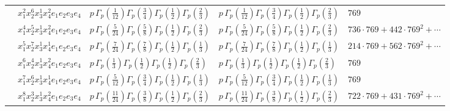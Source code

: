 \documentclass[11pt]{article}
\begin{document}
\begin{table}[ht]
{\begin{tabular}{@{}lllll@{}}
 & $x_{1}^{2} x_{2}^{6} x_{3}^{1} x_{4}^{2}  e_{1} e_{2} e_{3} e_{4}$ & $p \, \Gamma_p \left( \frac{1}{12} \right) \Gamma_p \left( \frac{3}{4} \right) \Gamma_p \left( \frac{1}{2} \right) \Gamma_p \left( \frac{2}{3} \right)$ & $p \, \Gamma_p \left( \frac{1}{12} \right) \Gamma_p \left( \frac{3}{4} \right) \Gamma_p \left( \frac{1}{2} \right) \Gamma_p \left( \frac{2}{3} \right)$ & $769$ \\
 & $x_{1}^{4} x_{2}^{5} x_{3}^{1} x_{4}^{2}  e_{1} e_{2} e_{3} e_{4}$ & $p \, \Gamma_p \left( \frac{5}{24} \right) \Gamma_p \left( \frac{5}{8} \right) \Gamma_p \left( \frac{1}{2} \right) \Gamma_p \left( \frac{2}{3} \right)$ & $p \, \Gamma_p \left( \frac{5}{24} \right) \Gamma_p \left( \frac{5}{8} \right) \Gamma_p \left( \frac{1}{2} \right) \Gamma_p \left( \frac{2}{3} \right)$ & $736{\cdot}769{+}442{\cdot}769^{2}{+}\cdots$ \\
 & $x_{1}^{5} x_{2}^{7} x_{3}^{1} x_{4}^{1}  e_{1} e_{2} e_{3} e_{4}$ & $p \, \Gamma_p \left( \frac{7}{24} \right) \Gamma_p \left( \frac{7}{8} \right) \Gamma_p \left( \frac{1}{2} \right) \Gamma_p \left( \frac{1}{3} \right)$ & $p \, \Gamma_p \left( \frac{7}{24} \right) \Gamma_p \left( \frac{7}{8} \right) \Gamma_p \left( \frac{1}{2} \right) \Gamma_p \left( \frac{1}{3} \right)$ & $214{\cdot}769{+}562{\cdot}769^{2}{+}\cdots$ \\
 & $x_{1}^{6} x_{2}^{4} x_{3}^{1} x_{4}^{2}  e_{1} e_{2} e_{3} e_{4}$ & $p \, \Gamma_p \left( \frac{1}{3} \right) \Gamma_p \left( \frac{1}{2} \right) \Gamma_p \left( \frac{1}{2} \right) \Gamma_p \left( \frac{2}{3} \right)$ & $p \, \Gamma_p \left( \frac{1}{3} \right) \Gamma_p \left( \frac{1}{2} \right) \Gamma_p \left( \frac{1}{2} \right) \Gamma_p \left( \frac{2}{3} \right)$ & $769$ \\
 & $x_{1}^{7} x_{2}^{6} x_{3}^{1} x_{4}^{1}  e_{1} e_{2} e_{3} e_{4}$ & $p \, \Gamma_p \left( \frac{5}{12} \right) \Gamma_p \left( \frac{3}{4} \right) \Gamma_p \left( \frac{1}{2} \right) \Gamma_p \left( \frac{1}{3} \right)$ & $p \, \Gamma_p \left( \frac{5}{12} \right) \Gamma_p \left( \frac{3}{4} \right) \Gamma_p \left( \frac{1}{2} \right) \Gamma_p \left( \frac{1}{3} \right)$ & $769$ \\
 & $x_{1}^{8} x_{2}^{3} x_{3}^{1} x_{4}^{2}  e_{1} e_{2} e_{3} e_{4}$ & $p \, \Gamma_p \left( \frac{11}{24} \right) \Gamma_p \left( \frac{3}{8} \right) \Gamma_p \left( \frac{1}{2} \right) \Gamma_p \left( \frac{2}{3} \right)$ & $p \, \Gamma_p \left( \frac{11}{24} \right) \Gamma_p \left( \frac{3}{8} \right) \Gamma_p \left( \frac{1}{2} \right) \Gamma_p \left( \frac{2}{3} \right)$ & $722{\cdot}769{+}431{\cdot}769^{2}{+}\cdots$ \\

\end{tabular}}
\end{table}
\end{document}
